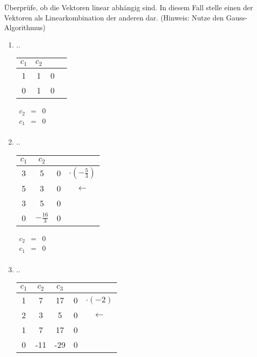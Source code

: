		Überprüfe, ob die Vektoren linear abhängig sind.
		In diesem Fall stelle einen der Vektoren als Linearkombination der anderen dar.
		(Hinweis: Nutze den Gauss-Algorithmus)
		
				\begin{enumerate}
				
					\item ..
					\begin{tabular} {cc|cc}
					$c_1$ & $c_2$ & &\\
					\hline
					1 & 1 & 0 & \\
					0 & 1 & 0 & \\
					\end{tabular}
						
							$\begin{array} {ccc}
								c_2 & = & 0\\
								c_1 & = & 0\\
							\end{array}$
					
						 \item ..
				    	
							\begin{tabular} {cc|cc}
								$c_1$ & $c_2$ & &\\
								\hline
								3 & 5 & 0 & $\cdot(-\frac{5}{3})$\\
								5 & 3 & 0 & $\leftarrow$ \\
								\hline
								3 & 5 & 0 & \\
								0 & $-\frac{16}{3}$ & 0 & \\
							\end{tabular}
						
						
						
							$\begin{array} {ccc}
								c_2 & = & 0\\
								c_1 & = & 0\\
							\end{array}$
					

					
						
						
				   
						
				    \item ..
						
							\begin{tabular} {ccc|cc}
								$c_1$ & $c_2$ & $c_3$ & &\\
								\hline
								1 & 7 & 17 & 0 & $\cdot(-2)$ \\
								2 & 3 & 5 & 0 & $\leftarrow$ \\
								\hline
								1 & 7 & 17 & 0 & \\
								0 & -11 & -29 & 0 & \\
							\end{tabular}
						

\end{enumerate}
